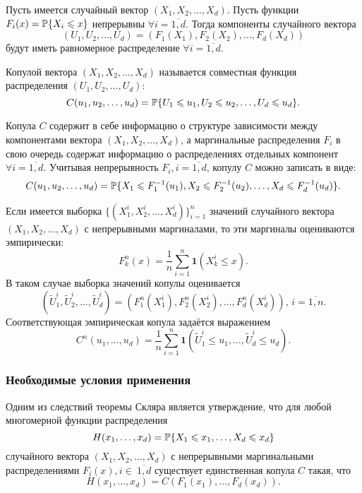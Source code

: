 \begin{define}
Пусть имеется случайный вектор $(X_1, X_2, \ldots, X_d)$. Пусть функции $F_i(x) = \P\{X_i \leq x\}$ непрерывны $\forall i = \overline{1, d}$. Тогда компоненты случайного вектора
\begin{equation}
(U_1, U_2, \ldots, U_d)= (F_1(X_1),F_2(X_2), \ldots, F_d(X_d))
\end{equation}
будут иметь равномерное распределение $\forall i = \overline{1, d}$.

Копулой вектора $(X_1, X_2, \ldots, X_d)$ называется совместная функция распределения $(U_1, U_2, \ldots, U_d)$:
\begin{equation}
C(u_1, u_2, \ldots, u_d)=\P\{U_1 \leq u_1, U_2 \leq u_2, \dots, U_d \leq u_d\}.
\end{equation}
\end{define}
Копула $C$ содержит в себе информацию о структуре зависимости между компонентами вектора $(X_1, X_2, \ldots, X_d)$, а маргинальные распределения $F_i$ в свою очередь содержат информацию о распределениях отдельных компонент $\forall i = \overline{1, d}$. Учитывая непрерывность $F_i, i = \overline{1, d}$, копулу $C$ можно записать в виде:
\begin{equation}
C(u_1, u_2, \ldots, u_d)=\P\{X_1 \leq F_1^{-1}(u_1), X_2 \leq F_2^{-1}(u_2), \ldots, X_d \leq F_d^{-1}(u_d)\}.
\end{equation}

Если имеется выборка $\{(X_1^i, X_2^i,\ldots, X_d^i)\}_{i=1}^n $ значений случайного вектора $(X_1, X_2, \ldots, X_d)$ с непрерывными маргиналами, то эти маргиналы оцениваются эмпирически:
\begin{equation}
	F_k^n(x) = \frac{1}{n} \sum_{i = 1}^n \mathbf{1}(X_k^i \leq x).
\end{equation}
В таком случае выборка значений копулы оценивается
\begin{equation}
	(\widetilde{U}_1^i, \widetilde{U}_2^i, \ldots, \widetilde{U}_d^i)=(F_1^n(X_1^i),F_2^n(X_2^i),\dots,F_d^n(X_d^i)), \, i = \overline{1, n}.
\end{equation}
Соответствующая эмпирическая копула задаётся выражением
\begin{equation}
	C^n(u_1, \ldots, u_d) = \frac{1}{n} \sum_{i = 1}^n \mathbf{1}(\widetilde{U}_1^i \leq u_1, \ldots, \widetilde{U}_d^i \leq u_d).
\end{equation}

\subsubsection*{Необходимые условия применения}
Одним из следствий теоремы Скляра является утверждение, что для любой многомерной функции распределения
\begin{equation}
	H(x_1, \ldots, x_d) = \P\{X_1 \leq x_1, \ldots, X_d \leq x_d\}
\end{equation}
случайного вектора $(X_1, X_2, \ldots, X_d)$ с непрерывными маргинальными распределениями $F_i(x), i \in~\overline{1, d}$ существует единственная копула $C$ такая, что
\begin{equation}
	H(x_1, \ldots, x_d) = C(F_1(x_1), \ldots, F_d(x_d)).
\end{equation}

